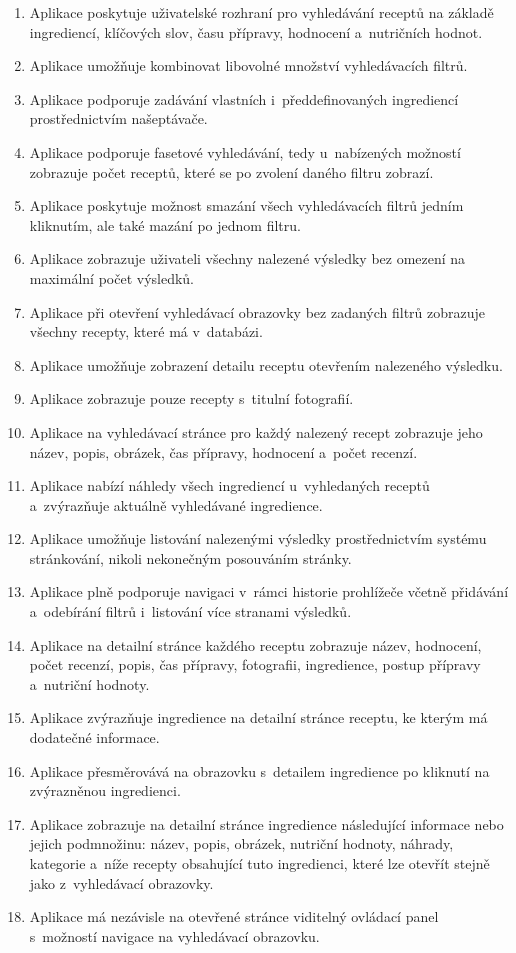 \begin{enumerate}
    \item Aplikace poskytuje uživatelské rozhraní pro vyhledávání receptů na základě ingrediencí, klíčových slov, času přípravy, hodnocení a~nutričních hodnot.
    \item Aplikace umožňuje kombinovat libovolné množství vyhledávacích filtrů.
    \item Aplikace podporuje zadávání vlastních i~předdefinovaných ingrediencí prostřednictvím našeptávače.
    \item Aplikace podporuje fasetové vyhledávání, tedy u~nabízených možností zobrazuje počet receptů, které se po zvolení daného filtru zobrazí.
    \item Aplikace poskytuje možnost smazání všech vyhledávacích filtrů jedním kliknutím, ale také mazání po jednom filtru.
    \item Aplikace zobrazuje uživateli všechny nalezené výsledky bez omezení na maximální počet výsledků.
    \item Aplikace při otevření vyhledávací obrazovky bez zadaných filtrů zobrazuje všechny recepty, které má v~databázi.
    \item Aplikace umožňuje zobrazení detailu receptu otevřením nalezeného výsledku.
    \item Aplikace zobrazuje pouze recepty s~titulní fotografií.
    \item Aplikace na vyhledávací stránce pro každý nalezený recept zobrazuje jeho název, popis, obrázek, čas přípravy, hodnocení a~počet recenzí.
    \item Aplikace nabízí náhledy všech ingrediencí u~vyhledaných receptů a~zvýrazňuje aktuálně vyhledávané ingredience.
    \item Aplikace umožňuje listování nalezenými výsledky prostřednictvím systému stránkování, nikoli nekonečným posouváním stránky.
    \item Aplikace plně podporuje navigaci v~rámci historie prohlížeče včetně přidávání a~odebírání filtrů i~listování více stranami výsledků.
    \item Aplikace na detailní stránce každého receptu zobrazuje název, hodnocení, počet recenzí, popis, čas přípravy, fotografii, ingredience, postup přípravy a~nutriční hodnoty.
    \item Aplikace zvýrazňuje ingredience na detailní stránce receptu, ke kterým má dodatečné informace.
    \item Aplikace přesměrovává na obrazovku s~detailem ingredience po kliknutí na zvýrazněnou ingredienci.
    \item Aplikace zobrazuje na detailní stránce ingredience následující informace nebo jejich podmnožinu: název, popis, obrázek, nutriční hodnoty, náhrady, kategorie a~níže recepty obsahující tuto ingredienci, které lze otevřít stejně jako z~vyhledávací obrazovky.
    \item Aplikace má nezávisle na otevřené stránce viditelný ovládací panel s~možností navigace na vyhledávací obrazovku.

\end{enumerate}

